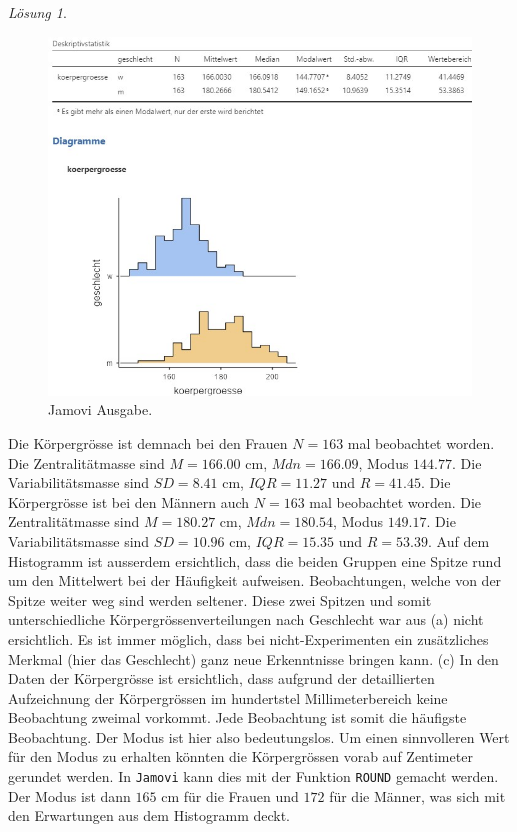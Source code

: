 \documentclass[
]{book}
\theoremstyle{definition}
\theoremstyle{definition}
\theoremstyle{definition}
\theoremstyle{definition}
\theoremstyle{remark}
\newtheorem*{solution}{Lösung}
\begin{document}
\begin{solution}
\begin{figure}
{\centering \includegraphics[width=1\linewidth]{figures/02-exr-koerpergroesse-sex-jmv-output-b} 

}

\caption{Jamovi Ausgabe.}\label{fig:sol-koerpergroesse-sex-output-b}
\end{figure}

Die Körpergrösse ist demnach bei den Frauen \(N=163\) mal beobachtet worden. Die Zentralitätmasse sind \(M=166.00\) cm, \(Mdn=166.09\), Modus \(144.77\). Die Variabilitätsmasse sind \(SD=8.41\) cm, \(IQR=11.27\) und \(R=41.45\). Die Körpergrösse ist bei den Männern auch \(N=163\) mal beobachtet worden. Die Zentralitätmasse sind \(M=180.27\) cm, \(Mdn=180.54\), Modus \(149.17\). Die Variabilitätsmasse sind \(SD=10.96\) cm, \(IQR=15.35\) und \(R=53.39\). Auf dem Histogramm ist ausserdem ersichtlich, dass die beiden Gruppen eine Spitze rund um den Mittelwert bei der Häufigkeit aufweisen. Beobachtungen, welche von der Spitze weiter weg sind werden seltener. Diese zwei Spitzen und somit unterschiedliche Körpergrössenverteilungen nach Geschlecht war aus (a) nicht ersichtlich. Es ist immer möglich, dass bei nicht-Experimenten ein zusätzliches Merkmal (hier das Geschlecht) ganz neue Erkenntnisse bringen kann.
(c) In den Daten der Körpergrösse ist ersichtlich, dass aufgrund der detaillierten Aufzeichnung der Körpergrössen im hundertstel Millimeterbereich keine Beobachtung zweimal vorkommt. Jede Beobachtung ist somit die häufigste Beobachtung. Der Modus ist hier also bedeutungslos. Um einen sinnvolleren Wert für den Modus zu erhalten könnten die Körpergrössen vorab auf Zentimeter gerundet werden. In \texttt{Jamovi} kann dies mit der Funktion \texttt{ROUND} gemacht werden. Der Modus ist dann \(165\) cm für die Frauen und \(172\) für die Männer, was sich mit den Erwartungen aus dem Histogramm deckt.

\end{solution}
\end{document}
